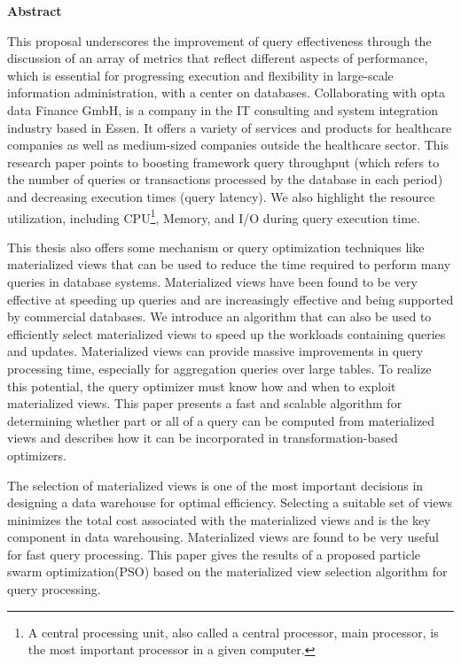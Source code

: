 \thispagestyle{empty}
\begin{center}
    \fancyhead[]{}\Large\textbf{Abstract}
\end{center}

\normalsize
This proposal underscores the improvement of query effectiveness through the discussion of an array of metrics that reflect different aspects of performance, which is essential for progressing execution and flexibility in large-scale information administration, with a center on databases. Collaborating with opta data Finance GmbH, is a company in the IT consulting and system integration industry based in Essen. It offers a variety of services and products for healthcare companies as well as medium-sized companies outside the healthcare sector. This research paper points to boosting framework query throughput (which refers to the number of queries or transactions processed by the database in each period) and decreasing execution times (query latency). We also highlight the resource utilization,  including CPU\footnote{A central processing unit, also called a central processor, main processor, is the most important processor in a given computer.}, Memory, and I/O during query execution time.\vspace{.4cm}

This thesis also offers some mechanism or query optimization techniques like materialized views that can be used to reduce the time required to perform many queries in database systems. Materialized views have been found to be very effective at speeding up queries and are increasingly effective and being supported by commercial databases. We introduce an algorithm that can also be used to efficiently select materialized views to speed up the workloads containing queries and updates. Materialized views can provide massive improvements in query processing time, especially for aggregation queries over large tables. To realize this potential, the query optimizer must know how and when to exploit materialized views. This paper presents a fast and scalable algorithm for determining whether part or all of a query can be computed from materialized views and describes how it can be incorporated in transformation-based optimizers.\vspace{.4cm}

The selection of materialized views is one of the most important decisions in designing a data warehouse for optimal efficiency. Selecting a suitable set of views minimizes the total cost associated with the materialized views and is the key component in data warehousing. Materialized views are found to be very useful for fast query processing. This paper gives the results of a proposed particle swarm optimization(PSO) based on the materialized view selection algorithm for query processing.\vspace{.4cm}



